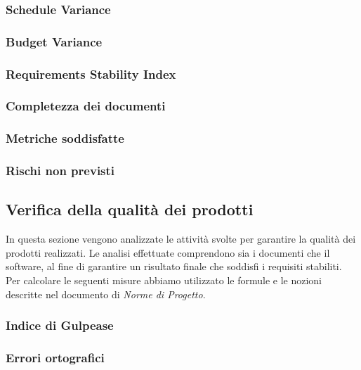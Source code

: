 \subsubsection{Schedule Variance}

\subsubsection{Budget Variance}

\subsubsection{Requirements Stability Index}

\subsubsection{Completezza dei documenti}

\subsubsection{Metriche soddisfatte}

\subsubsection{Rischi non previsti}

\subsection{Verifica della qualità dei prodotti}
In questa sezione vengono analizzate le attività svolte per garantire la qualità dei prodotti realizzati. Le analisi effettuate comprendono sia i documenti che il software, al fine di garantire un risultato finale che soddisfi i requisiti stabiliti.\\
Per calcolare le seguenti misure abbiamo utilizzato le formule e le nozioni descritte nel documento di \textit{Norme di Progetto}.

\subsubsection{Indice di Gulpease}

\subsubsection{Errori ortografici}

